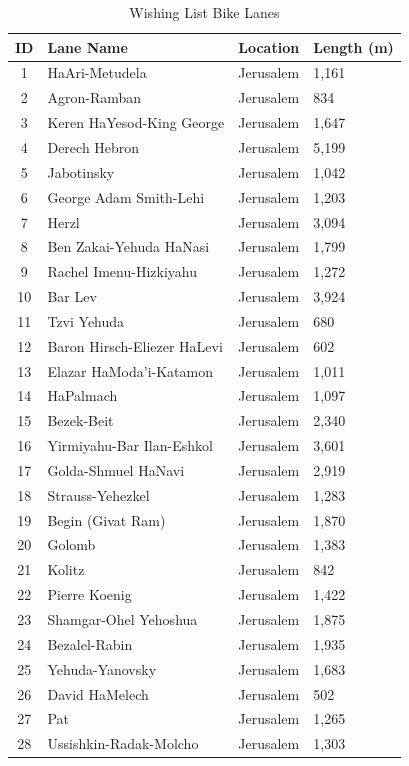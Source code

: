\begin{table}[H]
\centering
\caption{Wishing List Bike Lanes}
\label{tab:wishing_list}
\small
\begin{tabular}{@{}clll@{}}
\toprule
\textbf{ID} & \textbf{Lane Name} & \textbf{Location} & \textbf{Length (m)} \\
\midrule
1 & HaAri-Metudela & Jerusalem & 1,161 \\
2 & Agron-Ramban & Jerusalem & 834 \\
3 & Keren HaYesod-King George & Jerusalem & 1,647 \\
4 & Derech Hebron & Jerusalem & 5,199 \\
5 & Jabotinsky & Jerusalem & 1,042 \\
6 & George Adam Smith-Lehi & Jerusalem & 1,203 \\
7 & Herzl & Jerusalem & 3,094 \\
8 & Ben Zakai-Yehuda HaNasi & Jerusalem & 1,799 \\
9 & Rachel Imenu-Hizkiyahu & Jerusalem & 1,272 \\
10 & Bar Lev & Jerusalem & 3,924 \\
11 & Tzvi Yehuda & Jerusalem & 680 \\
12 & Baron Hirsch-Eliezer HaLevi & Jerusalem & 602 \\
13 & Elazar HaModa'i-Katamon & Jerusalem & 1,011 \\
14 & HaPalmach & Jerusalem & 1,097 \\
15 & Bezek-Beit & Jerusalem & 2,340 \\
16 & Yirmiyahu-Bar Ilan-Eshkol & Jerusalem & 3,601 \\
17 & Golda-Shmuel HaNavi & Jerusalem & 2,919 \\
18 & Strauss-Yehezkel & Jerusalem & 1,283 \\
19 & Begin (Givat Ram) & Jerusalem & 1,870 \\
20 & Golomb & Jerusalem & 1,383 \\
21 & Kolitz & Jerusalem & 842 \\
22 & Pierre Koenig & Jerusalem & 1,422 \\
23 & Shamgar-Ohel Yehoshua & Jerusalem & 1,875 \\
24 & Bezalel-Rabin & Jerusalem & 1,935 \\
25 & Yehuda-Yanovsky & Jerusalem & 1,683 \\
26 & David HaMelech & Jerusalem & 502 \\
27 & Pat & Jerusalem & 1,265 \\
28 & Ussishkin-Radak-Molcho & Jerusalem & 1,303 \\
\bottomrule
\end{tabular}
\end{table}

